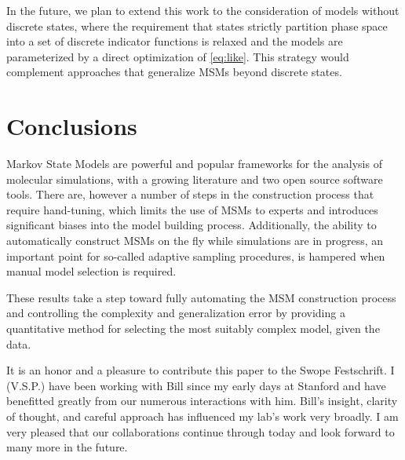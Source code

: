 \documentclass[journal=jpcbfk, layout=twocolumn, manuscript=article]{achemso}
\begin{document}
In the future, we plan to extend this work to the consideration of models without discrete states, where the requirement that states strictly partition phase space into a set of discrete indicator functions is relaxed and the models are parameterized by a direct optimization of \cref{eq:like}. This strategy would complement approaches that generalize MSMs beyond discrete states\cite{Noe2013Variational}.

\section{Conclusions}

Markov State Models are powerful and popular frameworks for the analysis of molecular simulations, with a growing literature and two open source software tools\cite{Beauchamp2011Msmbuilder2, Senne2012EMMA}. There are, however a number of steps in the construction process that require hand-tuning, which limits the use of MSMs to experts and introduces significant biases into the model building process. Additionally, the ability to automatically construct MSMs on the fly while simulations are in progress, an important point for so-called adaptive sampling procedures\cite{Bowman2010Enhanced}, is hampered when manual model selection is required. 

These results take a step toward fully automating the MSM construction process and controlling the complexity and generalization error by providing a quantitative method for selecting the most suitably complex model, given the data.

\begin{acknowledgement}
It is an honor and a pleasure to contribute this paper to the Swope Festschrift.  I (V.S.P.) have been working with Bill since my early days at Stanford and have benefitted greatly from our numerous interactions with him.  Bill's insight, clarity of thought, and careful approach has influenced my lab's work very broadly.  I am very pleased that our collaborations continue through today and look forward to many more in the future.
\end{acknowledgement}


\end{document}
